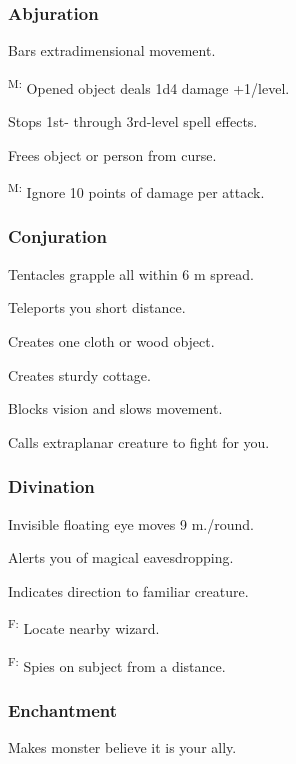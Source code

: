 \subsubsection{Abjuration}
	 Bars extradimensional movement.

	\textsuperscript{M:} Opened object deals 1d4 damage +1/level.

	 Stops 1st- through 3rd-level spell effects.

	 Frees object or person from curse.

	\textsuperscript{M:} Ignore 10 points of damage per attack.

\subsubsection{Conjuration}
	 Tentacles grapple all within 6 m spread.

	 Teleports you short distance.

	 Creates one cloth or wood object.

	 Creates sturdy cottage.

	 Blocks vision and slows movement.

	 Calls extraplanar creature to fight for you.

\subsubsection{Divination}
	 Invisible floating eye moves 9 m./round.

	 Alerts you of magical eavesdropping.

	 Indicates direction to familiar creature.

	\textsuperscript{F:} Locate nearby wizard. %

	\textsuperscript{F:} Spies on subject from a distance.

\subsubsection{Enchantment}
	 Makes monster believe it is your ally.

